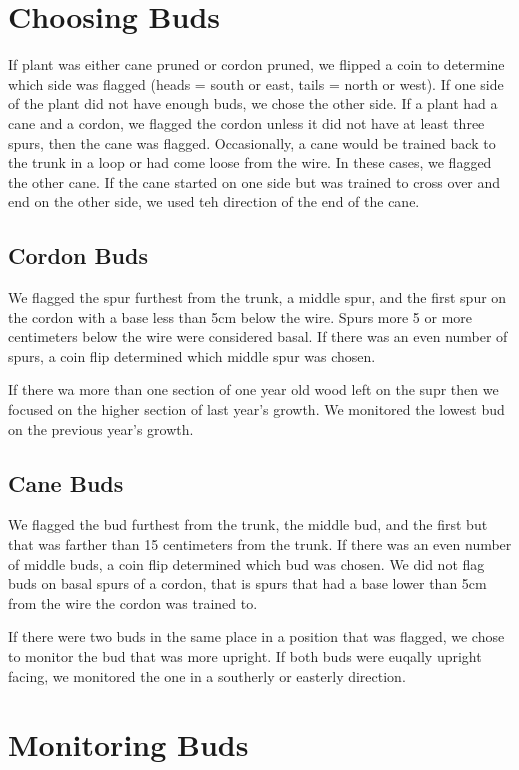 \documentclass[11pt,letter]{article}
\begin{document}
\section{Choosing Buds}

If plant was either cane pruned or cordon pruned, we flipped a coin to determine which side was flagged (heads = south or east, tails = north or west). If one side of the plant did not have enough buds, we chose the other side. If a plant had a cane and a cordon, we flagged the cordon unless it did not have at least three spurs, then the cane was flagged. Occasionally, a cane would be trained back to the trunk in a loop or had come loose from the wire. In these cases, we flagged the other cane. If the cane started on one side but was trained to cross over and end on the other side, we used teh direction of the end of the cane. 

\subsection{Cordon Buds}

We flagged the spur furthest from the trunk, a middle spur, and the first spur on the cordon with a base less than 5cm below the wire. Spurs more 5 or more centimeters below the wire were considered basal. If there was an even number of spurs, a coin flip determined which middle spur was chosen.

If there wa more than one section of one year old wood left on the supr then we focused on the higher section of last year's growth. We monitored the lowest bud on the previous year's growth.

\subsection{Cane Buds}

We flagged the bud furthest from the trunk, the middle bud, and the first but that was farther than 15 centimeters from the trunk. If there was an even number of middle buds, a coin flip determined which bud was chosen. We did not flag buds on basal spurs of a cordon, that is spurs that had a base lower than 5cm from the wire the cordon was trained to. 

If there were two buds in the same place in a position that was flagged, we chose to monitor the bud that was more upright. If both buds were euqally upright facing, we monitored the one in a southerly or easterly direction. 

\section{Monitoring Buds}
\end{document}
